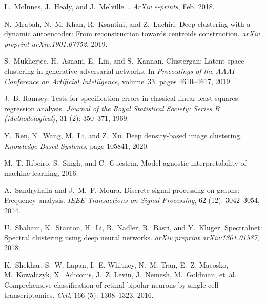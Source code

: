 \documentclass{article}
\begin{document}
\begin{thebibliography}{30}
L.~{McInnes}, J.~{Healy}, and J.~{Melville}.
.
\newblock \emph{ArXiv e-prints}, Feb. 2018.

N.~Mrabah, N.~M. Khan, R.~Ksantini, and Z.~Lachiri.
\newblock Deep clustering with a dynamic autoencoder: From reconstruction
  towards centroids construction.
\newblock \emph{arXiv preprint arXiv:1901.07752}, 2019.

S.~Mukherjee, H.~Asnani, E.~Lin, and S.~Kannan.
\newblock Clustergan: Latent space clustering in generative adversarial
  networks.
\newblock In \emph{Proceedings of the AAAI Conference on Artificial
  Intelligence}, volume~33, pages 4610--4617, 2019.

J.~B. Ramsey.
\newblock Tests for specification errors in classical linear least-squares
  regression analysis.
\newblock \emph{Journal of the Royal Statistical Society: Series B
  (Methodological)}, 31 (2): 350--371, 1969.

Y.~Ren, N.~Wang, M.~Li, and Z.~Xu.
\newblock Deep density-based image clustering.
\newblock \emph{Knowledge-Based Systems}, page 105841, 2020.

M.~T. Ribeiro, S.~Singh, and C.~Guestrin.
\newblock Model-agnostic interpretability of machine learning, 2016.

A.~{Sandryhaila} and J.~M.~F. {Moura}.
\newblock Discrete signal processing on graphs: Frequency analysis.
\newblock \emph{IEEE Transactions on Signal Processing}, 62
  (12): 3042--3054, 2014.

U.~Shaham, K.~Stanton, H.~Li, B.~Nadler, R.~Basri, and Y.~Kluger.
\newblock Spectralnet: Spectral clustering using deep neural networks.
\newblock \emph{arXiv preprint arXiv:1801.01587}, 2018.

K.~Shekhar, S.~W. Lapan, I.~E. Whitney, N.~M. Tran, E.~Z. Macosko,
  M.~Kowalczyk, X.~Adiconis, J.~Z. Levin, J.~Nemesh, M.~Goldman, et~al.
\newblock Comprehensive classification of retinal bipolar neurons by
  single-cell transcriptomics.
\newblock \emph{Cell}, 166 (5): 1308--1323, 2016.


\end{thebibliography}
\end{document}
